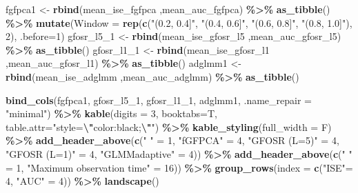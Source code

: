 \documentclass[
]{article}
\newenvironment{Shaded}{\begin{snugshade}}{\end{snugshade}}
\newcommand{\AttributeTok}[1]{\textcolor[rgb]{0.13,0.29,0.53}{#1}}
\newcommand{\DecValTok}[1]{\textcolor[rgb]{0.00,0.00,0.81}{#1}}
\newcommand{\FunctionTok}[1]{\textcolor[rgb]{0.13,0.29,0.53}{\textbf{#1}}}
\newcommand{\NormalTok}[1]{#1}
\newcommand{\OtherTok}[1]{\textcolor[rgb]{0.56,0.35,0.01}{#1}}
\newcommand{\SpecialCharTok}[1]{\textcolor[rgb]{0.81,0.36,0.00}{\textbf{#1}}}
\newcommand{\StringTok}[1]{\textcolor[rgb]{0.31,0.60,0.02}{#1}}
\begin{document}
\begin{Shaded}
\begin{Highlighting}[]
\NormalTok{fgfpca1 }\OtherTok{\textless{}{-}} \FunctionTok{rbind}\NormalTok{(mean\_ise\_fgfpca ,mean\_auc\_fgfpca) }\SpecialCharTok{\%\textgreater{}\%} \FunctionTok{as\_tibble}\NormalTok{() }\SpecialCharTok{\%\textgreater{}\%}
  \FunctionTok{mutate}\NormalTok{(}\AttributeTok{Window =} \FunctionTok{rep}\NormalTok{(}\FunctionTok{c}\NormalTok{(}\StringTok{"(0.2, 0.4]"}\NormalTok{, }\StringTok{"(0.4, 0.6]"}\NormalTok{, }\StringTok{"(0.6, 0.8]"}\NormalTok{, }\StringTok{"(0.8, 1.0]"}\NormalTok{), }\DecValTok{2}\NormalTok{), }\AttributeTok{.before=}\DecValTok{1}\NormalTok{)}
\NormalTok{gfosr\_l5\_1 }\OtherTok{\textless{}{-}} \FunctionTok{rbind}\NormalTok{(mean\_ise\_gfosr\_l5 ,mean\_auc\_gfosr\_l5) }\SpecialCharTok{\%\textgreater{}\%} \FunctionTok{as\_tibble}\NormalTok{()}
\NormalTok{gfosr\_l1\_1 }\OtherTok{\textless{}{-}} \FunctionTok{rbind}\NormalTok{(mean\_ise\_gfosr\_l1 ,mean\_auc\_gfosr\_l1) }\SpecialCharTok{\%\textgreater{}\%} \FunctionTok{as\_tibble}\NormalTok{()}
\NormalTok{adglmm1 }\OtherTok{\textless{}{-}} \FunctionTok{rbind}\NormalTok{(mean\_ise\_adglmm ,mean\_auc\_adglmm) }\SpecialCharTok{\%\textgreater{}\%} \FunctionTok{as\_tibble}\NormalTok{() }

\FunctionTok{bind\_cols}\NormalTok{(fgfpca1, gfosr\_l5\_1, gfosr\_l1\_1, adglmm1, }\AttributeTok{.name\_repair =} \StringTok{"minimal"}\NormalTok{) }\SpecialCharTok{\%\textgreater{}\%}
  \FunctionTok{kable}\NormalTok{(}\AttributeTok{digits =} \DecValTok{3}\NormalTok{, }\AttributeTok{booktabs=}\NormalTok{T,}
        \AttributeTok{table.attr=}\StringTok{"style=}\SpecialCharTok{\textbackslash{}"}\StringTok{color:black;}\SpecialCharTok{\textbackslash{}"}\StringTok{"}\NormalTok{) }\SpecialCharTok{\%\textgreater{}\%}
  \FunctionTok{kable\_styling}\NormalTok{(}\AttributeTok{full\_width =}\NormalTok{ F) }\SpecialCharTok{\%\textgreater{}\%} 
  \FunctionTok{add\_header\_above}\NormalTok{(}\FunctionTok{c}\NormalTok{(}\StringTok{" "} \OtherTok{=} \DecValTok{1}\NormalTok{, }\StringTok{"fGFPCA"} \OtherTok{=} \DecValTok{4}\NormalTok{, }\StringTok{"GFOSR (L=5)"} \OtherTok{=} \DecValTok{4}\NormalTok{, }
                     \StringTok{"GFOSR (L=1)"} \OtherTok{=} \DecValTok{4}\NormalTok{, }\StringTok{"GLMMadaptive"} \OtherTok{=} \DecValTok{4}\NormalTok{)) }\SpecialCharTok{\%\textgreater{}\%}
  \FunctionTok{add\_header\_above}\NormalTok{(}\FunctionTok{c}\NormalTok{(}\StringTok{" "} \OtherTok{=} \DecValTok{1}\NormalTok{, }\StringTok{"Maximum observation time"} \OtherTok{=} \DecValTok{16}\NormalTok{)) }\SpecialCharTok{\%\textgreater{}\%}
  \FunctionTok{group\_rows}\NormalTok{(}\AttributeTok{index =} \FunctionTok{c}\NormalTok{(}\StringTok{"ISE"}\OtherTok{=} \DecValTok{4}\NormalTok{, }\StringTok{"AUC"} \OtherTok{=} \DecValTok{4}\NormalTok{)) }\SpecialCharTok{\%\textgreater{}\%}
  \FunctionTok{landscape}\NormalTok{()}
\end{Highlighting}
\end{Shaded}
\end{document}
